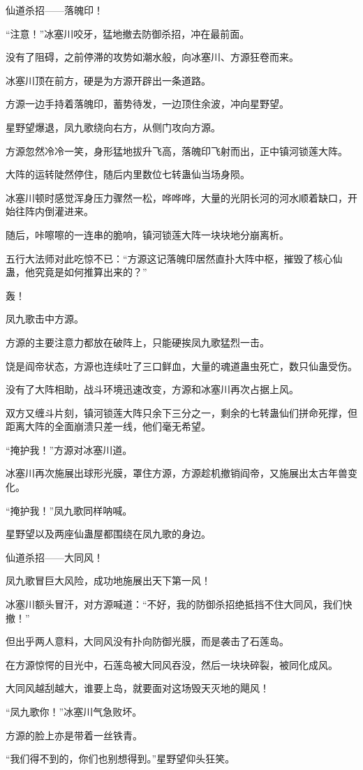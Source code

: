 \begin{this_body}
仙道杀招——落魄印！

“注意！”冰塞川咬牙，猛地撤去防御杀招，冲在最前面。

没有了阻碍，之前停滞的攻势如潮水般，向冰塞川、方源狂卷而来。

冰塞川顶在前方，硬是为方源开辟出一条道路。

方源一边手持着落魄印，蓄势待发，一边顶住余波，冲向星野望。

星野望爆退，凤九歌绕向右方，从侧门攻向方源。

方源忽然冷冷一笑，身形猛地拔升飞高，落魄印飞射而出，正中镇河锁莲大阵。

大阵的运转陡然停住，随后内里数位七转蛊仙当场身陨。

冰塞川顿时感觉浑身压力骤然一松，哗哗哗，大量的光阴长河的河水顺着缺口，开始往阵内倒灌进来。

随后，咔嚓嚓的一连串的脆响，镇河锁莲大阵一块块地分崩离析。

五行大法师对此吃惊不已：“方源这记落魄印居然直扑大阵中枢，摧毁了核心仙蛊，他究竟是如何推算出来的？”

轰！

凤九歌击中方源。

方源的主要注意力都放在破阵上，只能硬挨凤九歌猛烈一击。

饶是阎帝状态，方源也连续吐了三口鲜血，大量的魂道蛊虫死亡，数只仙蛊受伤。

没有了大阵相助，战斗环境迅速改变，方源和冰塞川再次占据上风。

双方又缠斗片刻，镇河锁莲大阵只余下三分之一，剩余的七转蛊仙们拼命死撑，但距离大阵的全面崩溃只差一线，他们毫无希望。

“掩护我！”方源对冰塞川道。

冰塞川再次施展出球形光膜，罩住方源，方源趁机撤销阎帝，又施展出太古年兽变化。

“掩护我！”凤九歌同样呐喊。

星野望以及两座仙蛊屋都围绕在凤九歌的身边。

仙道杀招——大同风！

凤九歌冒巨大风险，成功地施展出天下第一风！

冰塞川额头冒汗，对方源喊道：“不好，我的防御杀招绝抵挡不住大同风，我们快撤！”

但出乎两人意料，大同风没有扑向防御光膜，而是袭击了石莲岛。

在方源惊愕的目光中，石莲岛被大同风吞没，然后一块块碎裂，被同化成风。

大同风越刮越大，谁要上岛，就要面对这场毁天灭地的飓风！

“凤九歌你！”冰塞川气急败坏。

方源的脸上亦是带着一丝铁青。

“我们得不到的，你们也别想得到。”星野望仰头狂笑。

\end{this_body}

